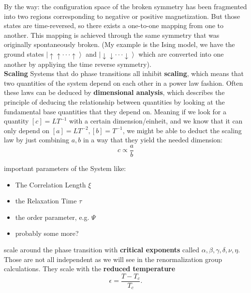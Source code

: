 	By the way: the configuration space of the broken symmetry has been fragmented into two regions corresponding to negative or positive magnetization. But those states are time-reversed, so there exists a one-to-one mapping from one to another. This mapping is achieved through the same symmetry that was originally spontaneously broken. (My example is the Ising model, we have the ground states $\left|\uparrow \uparrow \cdot \cdot \cdot \uparrow \right\rangle$ and $\left|\downarrow \downarrow \cdot \cdot \cdot \downarrow \right\rangle$ which are converted into one another by appliying the time reverse symmetry). \\
	
	\textbf{Scaling}
	Systems that do phase transitions all inhibit \textbf{scaling}, which means that two quantities of the system depend on each other in a power law fashion. Often these laws can be deduced by \textbf{dimensional analysis}, which describes the principle of deducing the relationship between quantities by looking at the fundamental base quantities that they depend on. Meaning if we look for a quantity $[c] =	LT^{-1}$ with a certain dimension/einheit, and we know that it can only depend on $[a] =	LT^{-2},[b] = T^{-1}$, we might be able to deduct the scaling law by just combining $a, b$ in a way that they yield the needed dimension:
	\begin{equation}
		c \propto \frac{a}{b}
	\end{equation}
	
	important parameters of the System like:
	\begin{itemize}
		\item The Correlation Length $\xi$
		\item the Relaxation Time $\tau$
		\item the order parameter, e.g. $\Psi$
		\item probably some more?
	\end{itemize}
	scale around the phase transition with \textbf{critical exponents} called $\alpha, \beta, \gamma, \delta, \nu, \eta$. Those are not all independent as we will see in the renormalization group calculations. They scale with the \textbf{reduced temperature}
	\begin{equation}
		\epsilon = \frac{T - T_c}{T_c}.
	\end{equation}
	
